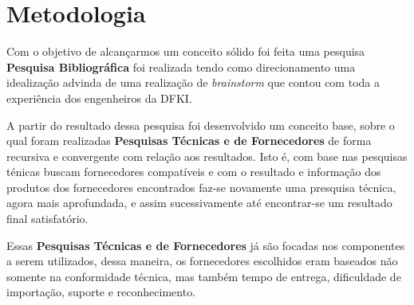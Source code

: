 


\section{Metodologia}

Com o objetivo de alcançarmos um conceito sólido foi feita uma pesquisa \textbf{Pesquisa
Bibliográfica} foi realizada tendo como direcionamento uma idealização advinda
de uma realização de \emph{brainstorm} que  contou com toda a experiência dos
engenheiros da DFKI.

A partir do resultado dessa pesquisa foi desenvolvido um conceito base, sobre o
qual foram realizadas \textbf{Pesquisas Técnicas e de Fornecedores} de forma
recursiva e convergente com relação aos resultados. Isto é, com base nas
pesquisas ténicas buscam fornecedores compatíveis e com o resultado e
informação dos produtos dos fornecedores encontrados faz-se novamente uma
presquisa técnica, agora mais aprofundada, e assim sucessivamente até
encontrar-se um resultado final satisfatório.

Essas  \textbf{Pesquisas Técnicas e de Fornecedores} já são focadas nos
componentes a serem utilizados, dessa maneira, os fornecedores escolhidos eram
baseados não somente na conformidade técnica, mas também tempo de entrega,
dificuldade de importação, suporte e reconhecimento.



